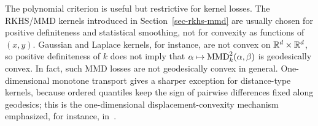 The polynomial criterion is useful but restrictive for kernel losses. The RKHS/MMD kernels introduced in Section~\ref{sec-rkhs-mmd} are usually chosen for positive definiteness and statistical smoothing, not for convexity as functions of \((x,y)\). Gaussian and Laplace kernels, for instance, are not convex on \(\mathbb{R}^d\times\mathbb{R}^d\), so positive definiteness of \(k\) does not imply that \(\alpha\mapsto\operatorname{MMD}_k^2(\alpha,\beta)\) is geodesically convex. In fact, such MMD losses are not geodesically convex in general. One-dimensional monotone transport gives a sharper exception for distance-type kernels, because ordered quantiles keep the sign of pairwise differences fixed along geodesics; this is the one-dimensional displacement-convexity mechanism emphasized, for instance, in~\cite{SantambrogioBook}.

